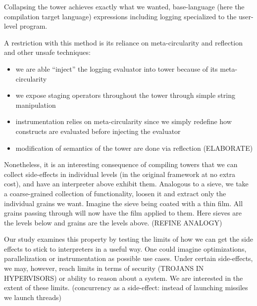 \documentclass[fleqn]{article}
\theoremstyle{definition}
\begin{document}
Collapsing the tower achieves exactly what we wanted, base-language (here the compilation target language) expressions including logging specialized to the user-level program.

A restriction with this method is its reliance on meta-circularity and reflection and other unsafe techniques:
\begin{itemize}
	\item we are able ``inject'' the logging evaluator into tower because of its meta-circularity
	\item we expose staging operators throughout the tower through simple string manipulation
	\item instrumentation relies on meta-circularity since we simply redefine how constructs are evaluated before injecting the evaluator
	\item modification of semantics of the tower are done via reflection (ELABORATE)
\end{itemize}

Nonetheless, it is an interesting consequence of compiling towers that we can collect side-effects in individual levels (in the original framework at no extra cost), and have an interpreter
above exhibit them. Analogous to a sieve, we take a coarse-grained collection of functionality, loosen it and extract only the individual grains we want. Imagine the sieve being coated with a thin film. All grains passing through
will now have the film applied to them. Here sieves are the levels below and grains are the levels above. (REFINE ANALOGY)

Our study examines this property by testing the limits of how we can get the side effects to stick to interpreters in a useful way. One could imagine optimizations, parallelization or instrumentation as possible use cases. Under certain side-effects, we may, however,
reach limits in terms of security (TROJANS IN HYPERVISORS) or ability to reason about a system. We are interested in the extent of these limits. (concurrency as a side-effect: instead of launching missiles we launch threads)
\end{document}
